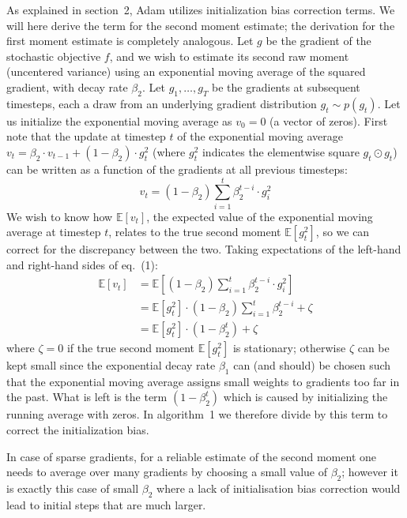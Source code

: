 \documentclass[11pt]{article}
\begin{document}
As explained in section~2, Adam utilizes initialization bias
correction terms. We will here derive the term for the second
moment estimate; the derivation for the first moment estimate is
completely analogous. Let $g$ be the gradient of the stochastic
objective $f$, and we wish to estimate its second raw moment
(uncentered variance) using an exponential moving average of the
squared gradient, with decay rate $\beta_2$. Let
$g_1, \ldots, g_T$ be the gradients at subsequent timesteps, each
a draw from an underlying gradient distribution
$g_t \sim p(g_t)$. Let us initialize the exponential moving
average as $v_0 = 0$ (a vector of zeros). First note that the
update at timestep $t$ of the exponential moving average
$v_t = \beta_2 \cdot v_{t-1} + (1 - \beta_2) \cdot g_t^2$ (where
$g_t^2$ indicates the elementwise square $g_t \odot g_t$) can be
written as a function of the gradients at all previous timesteps:
%
\begin{equation}
v_t = (1 - \beta_2) \sum_{i=1}^{t} \beta_2^{t-i} \cdot g_i^2
\end{equation}
%
We wish to know how $\mathbb{E}[v_t]$, the expected value of the
exponential moving average at timestep $t$, relates to the true
second moment $\mathbb{E}[g_t^2]$, so we can correct for the
discrepancy between the two. Taking expectations of the left-hand
and right-hand sides of eq.~(1):
%
\begin{align}
\mathbb{E}[v_t] &= \mathbb{E}\!\left[(1 - \beta_2) \sum_{i=1}^{t} \beta_2^{t-i} \cdot g_i^2\right] \\
                &= \mathbb{E}[g_t^2] \cdot (1 - \beta_2) \sum_{i=1}^{t} \beta_2^{t-i} + \zeta \\
                &= \mathbb{E}[g_t^2] \cdot (1 - \beta_2^t) + \zeta
\end{align}
%
where $\zeta = 0$ if the true second moment $\mathbb{E}[g_t^2]$ is
stationary; otherwise $\zeta$ can be kept small since the
exponential decay rate $\beta_1$ can (and should) be chosen such
that the exponential moving average assigns small weights to
gradients too far in the past. What is left is the term
$(1 - \beta_2^t)$ which is caused by initializing the running
average with zeros. In algorithm~1 we therefore divide by this
term to correct the initialization bias.

In case of sparse gradients, for a reliable estimate of the second
moment one needs to average over many gradients by choosing a
small value of $\beta_2$; however it is exactly this case of small
$\beta_2$ where a lack of initialisation bias correction would
lead to initial steps that are much larger.
\end{document}
